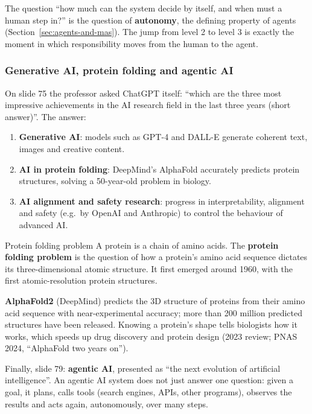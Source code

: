 \begin{nbintuition}
The question ``how much can the system decide by itself, and when must a human step in?''
is the question of \textbf{autonomy}, the defining property of agents
(Section~\ref{sec:agents-and-mas}). The jump from level 2 to level 3 is exactly the moment
in which responsibility moves from the human to the agent.
\end{nbintuition}

\subsubsection{Generative AI, protein folding and agentic AI}

On slide 75 the professor asked ChatGPT itself: ``which are the three most impressive
achievements in the AI research field in the last three years (short answer)''. The answer:
\begin{enumerate}[nosep]
  \item \textbf{Generative AI}: models such as GPT-4 and DALL-E generate coherent text,
        images and creative content.
  \item \textbf{AI in protein folding}: DeepMind's AlphaFold accurately predicts protein
        structures, solving a 50-year-old problem in biology.
  \item \textbf{AI alignment and safety research}: progress in interpretability, alignment
        and safety (e.g.\ by OpenAI and Anthropic) to control the behaviour of advanced AI.
\end{enumerate}

\begin{nbdef}{Protein folding problem}
A protein is a chain of amino acids. The \textbf{protein folding problem} is the question of
how a protein's amino acid sequence dictates its three-dimensional atomic structure. It
first emerged around 1960, with the first atomic-resolution protein structures.
\end{nbdef}

\textbf{AlphaFold2} (DeepMind) predicts the 3D structure of proteins from their amino acid
sequence with near-experimental accuracy; more than 200 million predicted structures have
been released. Knowing a protein's shape tells biologists how it works, which speeds up
drug discovery and protein design (2023 review; PNAS 2024, ``AlphaFold two years on'').

Finally, slide 79: \textbf{agentic AI}, presented as ``the next evolution of artificial
intelligence''. An agentic AI system does not just answer one question: given a goal, it
plans, calls tools (search engines, APIs, other programs), observes the results and acts
again, autonomously, over many steps.

